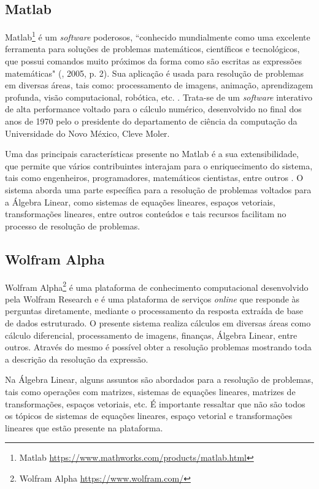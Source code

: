 {{\subsection{Matlab}
\noindent Matlab\footnote[1]{Matlab \url{https://www.mathworks.com/products/matlab.html}} é um \textit{software} poderosos, ``conhecido mundialmente como uma excelente ferramenta para soluções de problemas matemáticos, científicos e tecnológicos, que possui comandos muito próximos da forma como são escritas as expressões matemáticas"  (\cite{2005:Marcello}, 2005, p. 2). Sua aplicação é usada para resolução de problemas em diversas áreas, tais como: processamento de imagens, animação, aprendizagem profunda, visão computacional, robótica, etc. \cite{2004:Wu}. Trata-se de um \textit{software} interativo de alta performance voltado para o cálculo numérico, desenvolvido no final dos anos de 1970 pelo o presidente do departamento de ciência da computação da Universidade do Novo México, Cleve Moler.

Uma das principais características presente no Matlab é a sua extensibilidade, que permite que vários contribuintes interajam  para o enriquecimento do sistema, tais como engenheiros, programadores, matemáticos cientistas, entre outros \cite{2005:Marcello}. O sistema aborda uma parte específica para a resolução de problemas voltados para a Álgebra Linear, como sistemas de equações lineares, espaços vetoriais, transformações lineares, entre outros conteúdos e tais recursos facilitam no processo de resolução de problemas.

\subsection{Wolfram Alpha}
\noindent Wolfram Alpha\footnote[2]{Wolfram Alpha \url{https://www.wolfram.com/}} é uma plataforma de conhecimento computacional desenvolvido pela Wolfram Research e é uma plataforma de serviços \textit{online} que responde às perguntas diretamente, mediante o processamento da resposta extraída de base de dados estruturado. O presente sistema realiza cálculos em diversas áreas como cálculo diferencial, processamento de imagens, finanças, Álgebra Linear, entre outros. Através do mesmo é possível obter a resolução problemas mostrando toda a descrição da resolução da expressão.

Na Álgebra Linear, alguns assuntos são abordados para a resolução de problemas, tais como operações com matrizes, sistemas de equações lineares, matrizes de transformações, espaços vetoriais, etc. É importante ressaltar que não são todos os tópicos de sistemas de equações lineares, espaço vetorial e transformações lineares que estão presente na plataforma. 

}}
